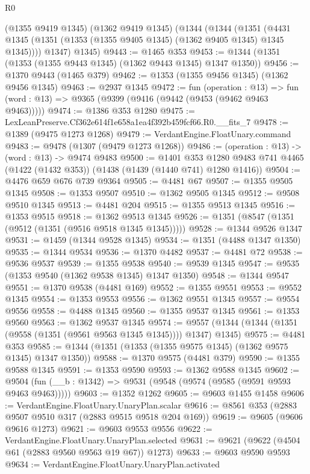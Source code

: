\begin{lexlean}{R0}
\begin{coremodule}
    (@1355 @9419 @1345)
    (@1362 @9419 @1345)
    (@1344
      (@1344
        (@1351 (@4431 @1345 (@1351 (@1353 (@1355 @9405 @1345) (@1362 @9405 @1345) @1345 @1345))))
        @1347)
      @1345)
@9443 := @1465 @353
@9453 := @1344 (@1351 (@1353 (@1355 @9443 @1345) (@1362 @9443 @1345) @1347 @1350))
@9456 := @1370 @9443 (@1465 @379)
@9462 := @1353 (@1355 @9456 @1345) (@1362 @9456 @1345)
@9463 := @2937 @1345
@9472 := fun (operation : @13) =>
  fun (word : @13) => @9365 (@9399 (@9416 (@9442 (@9453 (@9462 @9463 @9463)))))
@9474 := @1386 @353 @1280
@9475 := LexLeanPreserve.Cf362e614f1e658a1ea4f392b459fcf66.R0.__fits_7
@9478 := @1389 (@9475 @1273 @1268)
@9479 := VerdantEngine.FloatUnary.command
@9483 := @9478 (@1307 (@9479 @1273 @1268))
@9486 := (operation : @13) -> (word : @13) -> @9474 @9483
@9500 := @1401
    @353
    @1280
    @9483
    @741
    @4465
    (@1422 (@1432 @353))
    (@1438 (@1439 (@1440 @741) @1280 @1416))
@9504 := @4476 @659 @676 @739 @9364
@9505 := @4481 @67
@9507 := @1355 @9505 @1345
@9508 := @1353 @9507
@9510 := @1362 @9505 @1345
@9512 := @9508 @9510 @1345
@9513 := @4481 @204
@9515 := @1355 @9513 @1345
@9516 := @1353 @9515
@9518 := @1362 @9513 @1345
@9526 := @1351 (@8547 (@1351 (@9512 (@1351 (@9516 @9518 @1345 @1345)))))
@9528 := @1344 @9526 @1347
@9531 := @1459 (@1344 @9528 @1345)
@9534 := @1351 (@4488 @1347 @1350)
@9535 := @1344 @9534
@9536 := @1370 @4482
@9537 := @4481 @72
@9538 := @9536 @9537
@9539 := @1355 @9538
@9540 := @9539 @1345
@9547 := @9535 (@1353 @9540 (@1362 @9538 @1345) @1347 @1350)
@9548 := @1344 @9547
@9551 := @1370 @9538 (@4481 @169)
@9552 := @1355 @9551
@9553 := @9552 @1345
@9554 := @1353 @9553
@9556 := @1362 @9551 @1345
@9557 := @9554 @9556
@9558 := @4488 @1345
@9560 := @1355 @9537 @1345
@9561 := @1353 @9560
@9563 := @1362 @9537 @1345
@9574 := @9557 (@1344 (@1344 (@1351 (@9558 (@1351 (@9561 @9563 @1345 @1345)))) @1347) @1345)
@9575 := @4481 @353
@9585 := @1344 (@1351 (@1353 (@1355 @9575 @1345) (@1362 @9575 @1345) @1347 @1350))
@9588 := @1370 @9575 (@4481 @379)
@9590 := @1355 @9588 @1345
@9591 := @1353 @9590
@9593 := @1362 @9588 @1345
@9602 := @9504 (fun (__b : @1342) => @9531 (@9548 (@9574 (@9585 (@9591 @9593 @9463 @9463)))))
@9603 := @1352 @1262
@9605 := @9603 @1455 @1458
@9606 := VerdantEngine.FloatUnary.UnaryPlan.scalar
@9616 := @8561 @353 (@2883 @9507 @9510 @317 (@2883 @9515 @9518 @204 @169))
@9619 := @9605 (@9606 @9616 @1273)
@9621 := @9603 @9553 @9556
@9622 := VerdantEngine.FloatUnary.UnaryPlan.selected
@9631 := @9621 (@9622 (@4504 @61 (@2883 @9560 @9563 @19 @67)) @1273)
@9633 := @9603 @9590 @9593
@9634 := VerdantEngine.FloatUnary.UnaryPlan.activated

\end{coremodule}
\end{lexlean}
